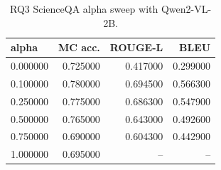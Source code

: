 \begin{table}
\caption{RQ3 ScienceQA alpha sweep with Qwen2-VL-2B.}
\label{tab:rq3_alpha}
\begin{tabular}{lrrr}
\toprule
alpha & MC acc. & ROUGE-L & BLEU \\
\midrule
0.000000 & 0.725000 & 0.417000 & 0.299000 \\
0.100000 & 0.780000 & 0.694500 & 0.566300 \\
0.250000 & 0.775000 & 0.686300 & 0.547900 \\
0.500000 & 0.765000 & 0.643000 & 0.492600 \\
0.750000 & 0.690000 & 0.604300 & 0.442900 \\
1.000000 & 0.695000 & -- & -- \\
\bottomrule
\end{tabular}
\end{table}

